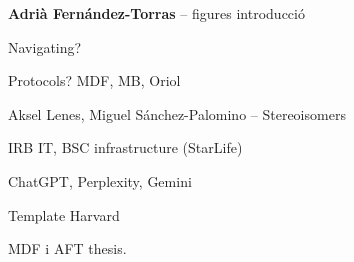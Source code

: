 

\textbf{Adrià Fernández-Torras} -- figures introducció

Navigating?

Protocols? MDF, MB, Oriol


Aksel Lenes, Miguel Sánchez-Palomino -- Stereoisomers



IRB IT, BSC infrastructure (StarLife)


ChatGPT, Perplexity, Gemini


Template Harvard

MDF i AFT thesis. 